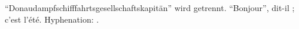 \documentclass{article}
\begin{document}
\enquote{Donaudampfschifffahrtsgesellschaftskapitän} wird getrennt.
\enquote{Bonjour}, dit-il ; c'est l'été.
Hyphenation: .
\end{document}
